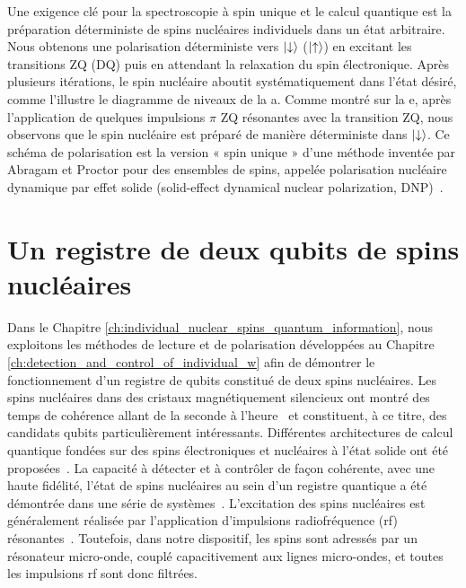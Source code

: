 Une exigence clé pour la spectroscopie à spin unique et le calcul quantique est la préparation déterministe de spins nucléaires individuels dans un état arbitraire. Nous obtenons une polarisation déterministe vers $\ket{\downarrow}$ ($\ket{\uparrow}$) en excitant les transitions ZQ (DQ) puis en attendant la relaxation du spin électronique. Après plusieurs itérations, le spin nucléaire aboutit systématiquement dans l'état désiré, comme l'illustre le diagramme de niveaux de la a. Comme montré sur la e, après l'application de quelques impulsions $\pi$ ZQ résonantes avec la transition ZQ, nous observons que le spin nucléaire \W est préparé de manière déterministe dans $\ket{\downarrow}$. Ce schéma de polarisation est la version « spin unique » d'une méthode inventée par Abragam et Proctor pour des ensembles de spins, appelée polarisation nucléaire dynamique par effet solide (solid-effect dynamical nuclear polarization, DNP)~.

\section*{Un registre de deux qubits de spins nucléaires}
Dans le Chapitre \ref{ch:individual_nuclear_spins_quantum_information}, nous exploitons les méthodes de lecture et de polarisation développées au Chapitre \ref{ch:detection_and_control_of_individual_w} afin de démontrer le fonctionnement d'un registre de qubits constitué de deux spins nucléaires. Les spins nucléaires dans des cristaux magnétiquement silencieux ont montré des temps de cohérence allant de la seconde à l'heure~ et constituent, à ce titre, des candidats qubits particulièrement intéressants. Différentes architectures de calcul quantique fondées sur des spins électroniques et nucléaires à l'état solide ont été proposées~\cite{dutt_quantum_2007b,awschalom_quantum_2018,zwanenburg_silicon_2013}. La capacité à détecter et à contrôler de façon cohérente, avec une haute fidélité, l'état de spins nucléaires au sein d'un registre quantique a été démontrée dans une série de systèmes~. L'excitation des spins nucléaires est généralement réalisée par l'application d'impulsions radiofréquence (rf) résonantes~. Toutefois, dans notre dispositif, les spins \Er sont adressés par un résonateur micro-onde, couplé capacitivement aux lignes micro-ondes, et toutes les impulsions rf sont donc filtrées.

